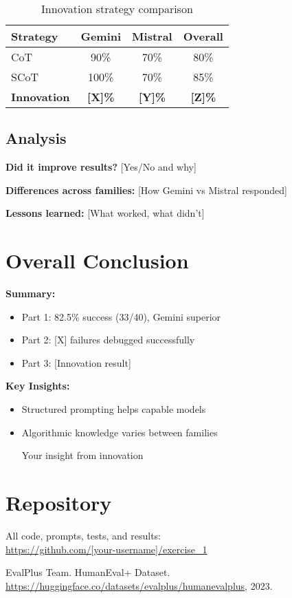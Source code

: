 \documentclass[11pt]{article}
\begin{document}
\begin{table}[h]
\centering
\begin{tabular}{lccc}
\toprule
\textbf{Strategy} & \textbf{Gemini} & \textbf{Mistral} & \textbf{Overall} \\
\midrule
CoT & 90\% & 70\% & 80\% \\
SCoT & 100\% & 70\% & 85\% \\
\textbf{Innovation} & \textbf{[X]\%} & \textbf{[Y]\%} & \textbf{[Z]\%} \\
\bottomrule
\end{tabular}
\caption{Innovation strategy comparison}
\end{table}

\subsection{Analysis}

\textbf{Did it improve results?} [Yes/No and why]

\textbf{Differences across families:} [How Gemini vs Mistral responded]

\textbf{Lessons learned:} [What worked, what didn't]

\section{Overall Conclusion}

\textbf{Summary:}
\begin{itemize}
    \item Part 1: 82.5\% success (33/40), Gemini superior
    \item Part 2: [X] failures debugged successfully
    \item Part 3: [Innovation result]
\end{itemize}

\textbf{Key Insights:}
\begin{itemize}
    \item Structured prompting helps capable models
    \item Algorithmic knowledge varies between families
    \item [Your insight from innovation]
\end{itemize}

\section{Repository}

All code, prompts, tests, and results:\\
\url{https://github.com/[your-username]/exercise_1}

\begin{thebibliography}{9}
EvalPlus Team. HumanEval+ Dataset. 
\url{https://huggingface.co/datasets/evalplus/humanevalplus}, 2023.
\end{thebibliography}
\end{document}
